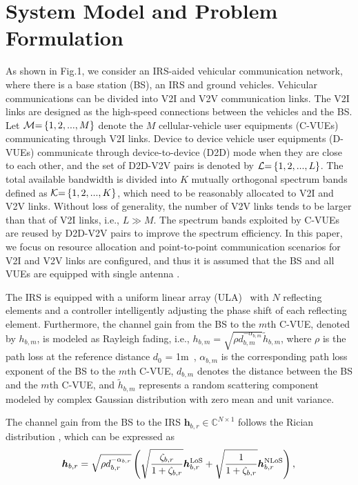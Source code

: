 \documentclass[journal]{IEEEtran}
\begin{document}
\section{System Model and Problem Formulation}
As shown in Fig.1, we consider an IRS-aided vehicular communication network, where there is a base station (BS), an IRS and ground vehicles. Vehicular communications can be divided into V2I and V2V communication links. The V2I links are designed as the high-speed connections between the vehicles and the BS. Let ${\cal M}{\rm{ = }}\left\{ {1,2,...,M} \right\}$ denote the $M$ cellular-vehicle user equipments (C-VUEs) communicating through V2I links. Device to device vehicle user equipments (D-VUEs) communicate through device-to-device (D2D) mode when they are close to each other, and the set of D2D-V2V pairs is denoted by ${\cal L}{\rm{ = }}\left\{ {1,2,...,L} \right\}$. The total available bandwidth is divided into $K$ mutually orthogonal spectrum bands defined as ${\cal K}{\rm{ = }}\left\{ {1,2,...,K} \right\}$, which need to be reasonably allocated to V2I and V2V links. Without loss of generality, the number of V2V links tends to be larger than that of V2I links, i.e., $L \gg M$. The spectrum bands exploited by C-VUEs are reused by D2D-V2V pairs to improve the spectrum efficiency. In this paper, we focus on resource allocation and point-to-point communication scenarios for V2I and V2V links are configured, and thus it is assumed that the BS and all VUEs are equipped with single antenna \cite{IOVRM-6}.

The IRS is equipped with a uniform linear array (ULA)~\cite{IRS-10} with $N$ reflecting elements and a controller intelligently adjusting the phase shift of each reflecting element. Furthermore, the channel gain from the BS to the $m$th C-VUE, denoted by ${h_{b,m}}$, is modeled as Rayleigh fading, i.e., ${h_{b,m}} = \sqrt {\rho d_{b,m}^{ - {\alpha _{b,m}}}} {\tilde h_{b,m}}$, where $\rho $ is the path loss at the reference distance $d_0$ = 1m~\cite{IRS-3}, ${\alpha _{b,m}}$ is the corresponding path loss exponent of the BS to the $m$th C-VUE, $d_{b,m}$ denotes the distance between the BS and the $m$th C-VUE, and ${\tilde h_{b,m}}$ represents a random scattering component modeled by complex Gaussian distribution with zero mean and unit variance.

The channel gain from the BS to the IRS ${\bm{h}_{b,r}} \in \mathbb{C}^{{N \times 1}}$ follows the Rician distribution \cite{zhang3}, which can be expressed as
\begin{equation}
{\bm{h}_{b,r}} = \sqrt {\rho d_{b,r}^{ - {\alpha _{b,r}}}} \left( {\sqrt {\frac{{{\zeta _{b,r}}}}{{1 + {\zeta _{b,r}}}}} \bm{h}_{b,r}^{{\rm{LoS}}} + \sqrt {\frac{1}{{1 + {\zeta _{b,r}}}}} \bm{h}_{b,r}^{{\rm{NLoS}}}} \right),\\
\end{equation}
\end{document}
